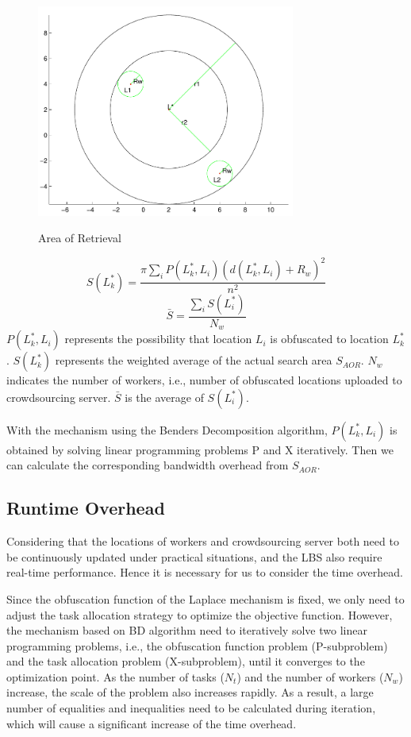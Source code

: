 \begin{figure}
\includegraphics[width=8.5cm]{AOR}
\label{img:AOR}
\caption{Area of Retrieval}
\end{figure}

$$
	S(L^*_k)=\frac{\pi \sum_i P(L^*_k,L_i)(d(L^*_k,L_i)+R_w)^2}{n^2}
$$
$$
	\bar{S}=\frac{\sum_i S(L^*_i)}{N_w}
$$
$P(L^*_k,L_i)$ represents the possibility that location $L_i$ is obfuscated to location $L^*_k$. $S(L^*_k)$ represents the weighted average of the actual search area $S_{AOR}$. $N_w$ indicates the number of workers, i.e., number of obfuscated locations uploaded to crowdsourcing server. $\bar{S}$ is the average of $S(L^*_i)$. 

With the mechanism using the Benders Decomposition algorithm, $P(L^*_k,L_i)$ is obtained by solving linear programming problems P and X iteratively. Then we can calculate the corresponding bandwidth overhead from $S_{AOR}$. 

\subsection{Runtime Overhead} %
Considering that the locations of workers and crowdsourcing server both need to be continuously updated under practical situations, and the LBS also require real-time performance. Hence it is necessary for us to consider the time overhead.

Since the obfuscation function of the Laplace mechanism is fixed, we only need to adjust the task allocation strategy to optimize the objective function. However, the mechanism based on BD algorithm need to iteratively solve two linear programming problems, i.e., the obfuscation function problem (P-subproblem) and the task allocation problem (X-subproblem), until it converges to the optimization point. As the number of tasks ($N_t$) and the number of workers ($N_w$) increase, the scale of the problem also increases rapidly. As a result, a large number of equalities and inequalities need to be calculated during iteration, which will cause a significant increase of the time overhead.

